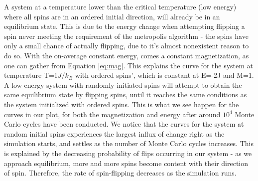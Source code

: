 \documentclass[10pt, nofootinbib, twocolumn]{revtex4-1}
\begin{document}
A system at a temperature lower than the critical temperature (low energy) where all spins are in an ordered initial direction, will already be in an equilibrium state. This is due to the energy change when attempting flipping a spin never meeting the requirement of the metropolis algorithm - the spins have only a small chance of actually flipping, due to it's almost nonexistent reason to do so. With the on-average constant energy, comes a constant magnetization, as one can gather from Equation \eqref{eq:mag}. This explains the curve for the system at temperature T=1$J/k_B$ with ordered spins', which is constant at E=-2J and M=1. A low energy system with randomly initiated spins will attempt to obtain the same equilibrium state by flipping spins, until it reaches the same conditions as the system initialized with ordered spins. This is what we see happen for the curves in our plot, for both the magnetization and energy after around $10^4$ Monte Carlo cycles have been conducted. We notice that the curves for the system at random initial spins experiences the largest influx of change right as the simulation starts, and settles as the number of Monte Carlo cycles increases. This is explained by the decreasing probability of flips occurring in our system - as we approach equilibrium, more and more spins become content with their direction of spin. Therefore, the rate of spin-flipping decreases as the simulation runs. \\
\end{document}
